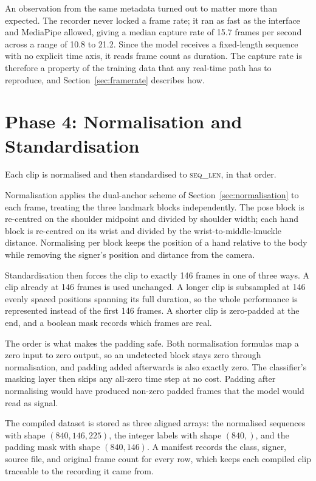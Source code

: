 An observation from the same metadata turned out to matter more than expected. The recorder never locked a frame rate; it ran as fast as the interface and MediaPipe allowed, giving a median capture rate of 15.7 frames per second across a range of 10.8 to 21.2. Since the model receives a fixed-length sequence with no explicit time axis, it reads frame count as duration. The capture rate is therefore a property of the training data that any real-time path has to reproduce, and Section~\ref{sec:framerate} describes how.

\section{Phase 4: Normalisation and Standardisation}

Each clip is normalised and then standardised to \textsc{seq\_len}, in that order.

Normalisation applies the dual-anchor scheme of Section~\ref{sec:normalisation} to each frame, treating the three landmark blocks independently. The pose block is re-centred on the shoulder midpoint and divided by shoulder width; each hand block is re-centred on its wrist and divided by the wrist-to-middle-knuckle distance. Normalising per block keeps the position of a hand relative to the body while removing the signer's position and distance from the camera.

Standardisation then forces the clip to exactly 146 frames in one of three ways. A clip already at 146 frames is used unchanged. A longer clip is subsampled at 146 evenly spaced positions spanning its full duration, so the whole performance is represented instead of the first 146 frames. A shorter clip is zero-padded at the end, and a boolean mask records which frames are real.

The order is what makes the padding safe. Both normalisation formulas map a zero input to zero output, so an undetected block stays zero through normalisation, and padding added afterwards is also exactly zero. The classifier's masking layer then skips any all-zero time step at no cost. Padding after normalising would have produced non-zero padded frames that the model would read as signal.

The compiled dataset is stored as three aligned arrays: the normalised sequences with shape $(840, 146, 225)$, the integer labels with shape $(840,)$, and the padding mask with shape $(840, 146)$. A manifest records the class, signer, source file, and original frame count for every row, which keeps each compiled clip traceable to the recording it came from.

